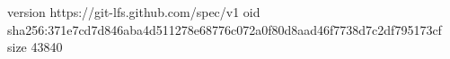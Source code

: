 version https://git-lfs.github.com/spec/v1
oid sha256:371e7cd7d846aba4d511278e68776c072a0f80d8aad46f7738d7c2df795173cf
size 43840
